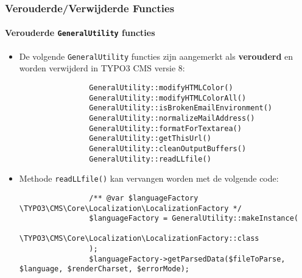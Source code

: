 \begin{frame}[fragile]
	\frametitle{Verouderde/Verwijderde Functies}
	\framesubtitle{Verouderde \texttt{GeneralUtility} functies}

	\lstset{basicstyle=\tiny\ttfamily}

	\begin{itemize}
		\item De volgende \texttt{GeneralUtility} functies zijn aangemerkt als \textbf{verouderd}
			en worden verwijderd in TYPO3 CMS versie 8:

			\begin{lstlisting}
				GeneralUtility::modifyHTMLColor()
				GeneralUtility::modifyHTMLColorAll()
				GeneralUtility::isBrokenEmailEnvironment()
				GeneralUtility::normalizeMailAddress()
				GeneralUtility::formatForTextarea()
				GeneralUtility::getThisUrl()
				GeneralUtility::cleanOutputBuffers()
				GeneralUtility::readLLfile()
			\end{lstlisting}

		\item Methode \texttt{readLLfile()} kan vervangen worden met de volgende code:

			\begin{lstlisting}
				/** @var $languageFactory \TYPO3\CMS\Core\Localization\LocalizationFactory */
				$languageFactory = GeneralUtility::makeInstance(
				  \TYPO3\CMS\Core\Localization\LocalizationFactory::class
				);
				$languageFactory->getParsedData($fileToParse, $language, $renderCharset, $errorMode);
			\end{lstlisting}

	\end{itemize}

\end{frame}


